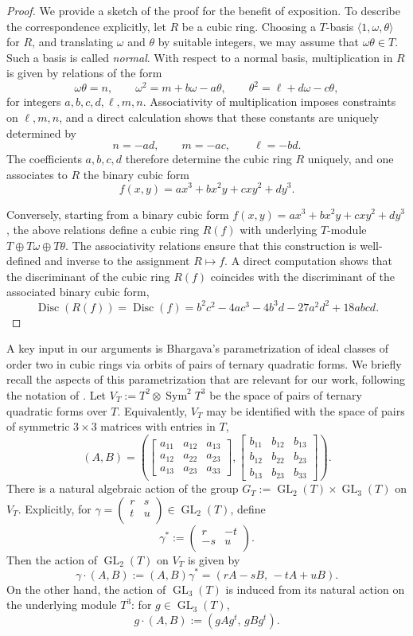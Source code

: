 \documentclass[table]{amsart}
\newcommand{\op}[1]{\operatorname{#1}}
\newcommand\mtx[4] { \left( {\begin{array}{cc}
 #1 & #2 \\
 #3 & #4 \\
 \end{array} } \right)}
\numberwithin{equation}{section}
\begin{document}
\begin{proof} We provide a sketch of the proof for the benefit of exposition. To describe the correspondence explicitly, let \(R\) be a cubic ring. Choosing a \(T\)-basis \(\langle 1,\omega,\theta\rangle\) for \(R\), and translating \(\omega\) and \(\theta\) by suitable integers, we may assume that \(\omega\theta\in T\). Such a basis is called \emph{normal}. With respect to a normal basis, multiplication in \(R\) is given by relations of the form
\[
\omega\theta = n, \qquad
\omega^{2} = m + b\omega - a\theta, \qquad
\theta^{2} = \ell + d\omega - c\theta,
\]
for integers \(a,b,c,d,\ell,m,n\). Associativity of multiplication imposes constraints on \(\ell,m,n\), and a direct calculation shows that these constants are uniquely determined by
\[
n=-ad, \qquad m=-ac, \qquad \ell=-bd.
\]
The coefficients \(a,b,c,d\) therefore determine the cubic ring \(R\) uniquely, and one associates to \(R\) the binary cubic form
\[
f(x,y)=ax^{3}+bx^{2}y+cxy^{2}+dy^{3}.
\]

Conversely, starting from a binary cubic form \(f(x,y)=ax^{3}+bx^{2}y+cxy^{2}+dy^{3}\), the above relations define a cubic ring \(R(f)\) with underlying \(T\)-module \(T\oplus T\omega\oplus T\theta\). The associativity relations ensure that this construction is well-defined and inverse to the assignment \(R\mapsto f\). A direct computation shows that the discriminant of the cubic ring \(R(f)\) coincides with the discriminant of the associated binary cubic form,
\[
\op{Disc}(R(f))=\op{Disc}(f)
= b^{2}c^{2}-4ac^{3}-4b^{3}d-27a^{2}d^{2}+18abcd.
\]
\end{proof}
\par
A key input in our arguments is Bhargava’s parametrization
\cite[Theorem~4]{bhargavahighercomplaws2} of ideal classes of order two in cubic
rings via orbits of pairs of ternary quadratic forms. We briefly recall the aspects of this
parametrization that are relevant for our work, following the notation of
\cite{BhargavaVarma}. Let $V_T := T^{2}\otimes \op{Sym}^{2} T^{3}$ be
the space of pairs of ternary quadratic forms over \(T\). Equivalently, \(V_T\)
may be identified with the space of pairs of symmetric \(3\times 3\) matrices
with entries in \(T\),
\[
(A,B)=
\left(
\begin{bmatrix}
a_{11} & a_{12} & a_{13}\\
a_{12} & a_{22} & a_{23}\\
a_{13} & a_{23} & a_{33}
\end{bmatrix},
\begin{bmatrix}
b_{11} & b_{12} & b_{13}\\
b_{12} & b_{22} & b_{23}\\
b_{13} & b_{23} & b_{33}
\end{bmatrix}
\right).
\]
\noindent There is a natural algebraic action of the group
\(G_T:=\op{GL}_2(T)\times \op{GL}_3(T)\) on \(V_T\). Explicitly, for
\(\gamma=\mtx{r}{s}{t}{u}\in \op{GL}_2(T)\), define
\[
\gamma^{*}:=\mtx{r}{-t}{-s}{u}.
\]
Then the action of \(\op{GL}_2(T)\) on \(V_T\) is given by
\[
\gamma\cdot (A,B) := (A,B)\gamma^{*} = (rA - sB,\,-tA + uB).
\]
On the other hand, the action of \(\op{GL}_3(T)\) is induced from its natural
action on the underlying module \(T^{3}\): for \(g\in \op{GL}_3(T)\),
\[
g\cdot (A,B) := (gAg^{t},\, gBg^{t}).
\]
\end{document}

